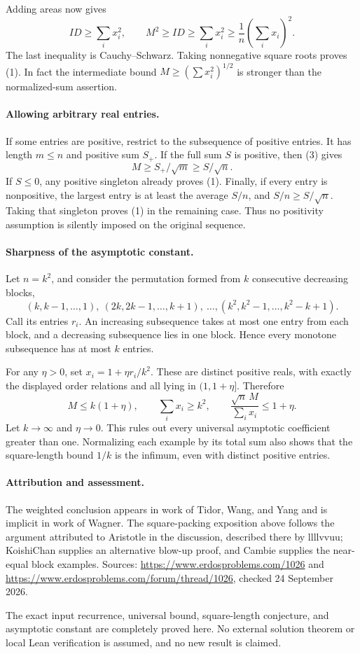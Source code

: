 Adding areas now gives
\[
 ID\geq\sum_i x_i^2,
 \qquad M^2\geq ID\geq\sum_i x_i^2
 \geq\frac1n\left(\sum_i x_i\right)^2. \tag{3}
\]
The last inequality is Cauchy--Schwarz. Taking nonnegative square roots proves (1). In fact the intermediate bound \(M\geq(\sum x_i^2)^{1/2}\) is stronger than the normalized-sum assertion.

\paragraph{Allowing arbitrary real entries.}
If some entries are positive, restrict to the subsequence of positive entries. It has length \(m\leq n\) and positive sum \(S_+\). If the full sum \(S\) is positive, then (3) gives
\[
 M\geq S_+/\sqrt m\geq S/\sqrt n.
\]
If \(S\leq0\), any positive singleton already proves (1). Finally, if every entry is nonpositive, the largest entry is at least the average \(S/n\), and
\(S/n\geq S/\sqrt n\). Taking that singleton proves (1) in the remaining case. Thus no positivity assumption is silently imposed on the original sequence.

\paragraph{Sharpness of the asymptotic constant.}
Let \(n=k^2\), and consider the permutation formed from \(k\) consecutive decreasing blocks,
\[
 (k,k-1,\ldots,1),\ (2k,2k-1,\ldots,k+1),\ \ldots,
 (k^2,k^2-1,\ldots,k^2-k+1).
\]
Call its entries \(r_i\). An increasing subsequence takes at most one entry from each block, and a decreasing subsequence lies in one block. Hence every monotone subsequence has at most \(k\) entries.

For any \(\eta>0\), set \(x_i=1+\eta r_i/k^2\). These are distinct positive reals, with exactly the displayed order relations and all lying in \((1,1+\eta]\). Therefore
\[
 M\leq k(1+\eta),\qquad \sum_i x_i\geq k^2,
 \qquad \frac{\sqrt n\,M}{\sum_i x_i}\leq1+\eta.
\]
Let \(k\to\infty\) and \(\eta\to0\). This rules out every universal asymptotic coefficient greater than one. Normalizing each example by its total sum also shows that the square-length bound \(1/k\) is the infimum, even with distinct positive entries.

\paragraph{Attribution and assessment.}
The weighted conclusion appears in work of Tidor, Wang, and Yang and is implicit in work of Wagner. The square-packing exposition above follows the argument attributed to Aristotle in the discussion, described there by llllvvuu; KoishiChan supplies an alternative blow-up proof, and Cambie supplies the near-equal block examples. Sources: \url{https://www.erdosproblems.com/1026} and \url{https://www.erdosproblems.com/forum/thread/1026}, checked 24 September 2026.

The exact input recurrence, universal bound, square-length conjecture, and asymptotic constant are completely proved here. No external solution theorem or local Lean verification is assumed, and no new result is claimed.
